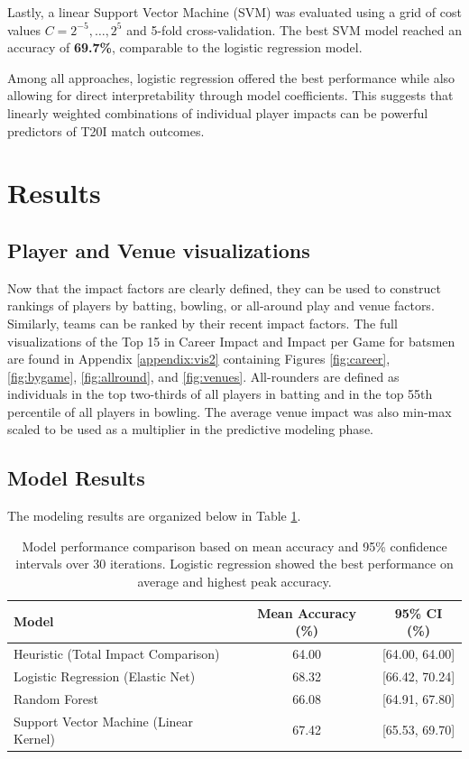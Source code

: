 \documentclass{article}[12pt]
\begin{document}
Lastly, a linear Support Vector Machine (SVM) was evaluated using a grid of cost values $C = 2^{-5}, \dots, 2^5$ and 5-fold cross-validation. \parencite{e1071} The best SVM model reached an accuracy of \textbf{69.7\%}, comparable to the logistic regression model.

Among all approaches, logistic regression offered the best performance while also allowing for direct interpretability through model coefficients. This suggests that linearly weighted combinations of individual player impacts can be powerful predictors of T20I match outcomes.



\section{Results}

\subsection{Player and Venue visualizations}
Now that the impact factors are clearly defined, they can be used to construct rankings of players by batting, bowling, or all-around play and venue factors. Similarly, teams can be ranked by their recent impact factors. The full visualizations of the Top 15 in Career Impact and Impact per Game for batsmen are found in Appendix \ref{appendix:vis2} containing Figures \ref{fig:career}, \ref{fig:bygame}, \ref{fig:allround}, and \ref{fig:venues}. All-rounders are defined as individuals in the top two-thirds of all players in batting and in the top 55th percentile of all players in bowling. The average venue impact was also min-max scaled to be used as a multiplier in the predictive modeling phase.

\subsection{Model Results}
The modeling results are organized below in Table \ref{tab:model-performance}.
\begin{table}[h!]
\centering
\begin{tabular}{|l|c|c|}
\hline
\textbf{Model} & \textbf{Mean Accuracy (\%)} & \textbf{95\% CI (\%)} \\
\hline
Heuristic (Total Impact Comparison) & 64.00 & [64.00, 64.00] \\
Logistic Regression (Elastic Net) & 68.32 & [66.42, 70.24] \\
Random Forest & 66.08 & [64.91, 67.80] \\
Support Vector Machine (Linear Kernel) & 67.42 & [65.53, 69.70] \\
\hline
\end{tabular}
\caption{Model performance comparison based on mean accuracy and 95\% confidence intervals over 30 iterations. Logistic regression showed the best performance on average and highest peak accuracy.}
\label{tab:model-performance}
\end{table}
\end{document}
